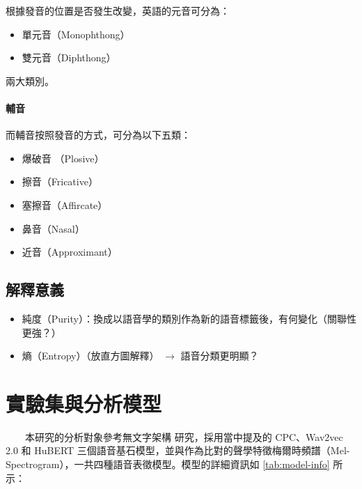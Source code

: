 
根據發音的位置是否發生改變，英語的元音可分為：

\begin{itemize}
    \item 單元音（Monophthong）
    \item 雙元音（Diphthong）
\end{itemize}

兩大類別。

\paragraph{輔音}

而輔音按照發音的方式，可分為以下五類：

\begin{itemize}
    \item 爆破音 （Plosive）
    \item 擦音（Fricative）
    \item 塞擦音（Affircate）
    \item 鼻音（Nasal）
    \item 近音（Approximant）
\end{itemize}

\subsection{解釋意義}

\begin{itemize}
    \item 純度（Purity）：換成以語音學的類別作為新的語音標籤後，有何變化（關聯性更強？）
    \item 熵（Entropy）（放直方圖解釋） \(\rightarrow\) 語音分類更明顯？
\end{itemize}


\section{實驗集與分析模型}

　　本研究的分析對象參考無文字架構 \cite{noauthor_textless_2021, lakhotia_generative_2021, lakhotia_generative_2021-1}  研究，採用當中提及的 CPC、Wav2vec 2.0 和 HuBERT 三個語音基石模型，並與作為比對的聲學特徵梅爾時頻譜（Mel-Spectrogram），一共四種語音表徵模型。模型的詳細資訊如 \ref{tab:model-info} 所示：

